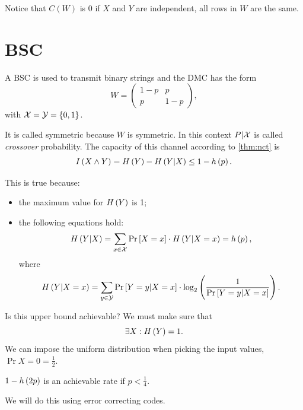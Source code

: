 Notice that $C(W)$ is 0 if $X$ and $Y$ are independent, \ie all rows in $W$ are the same. 

\section{\acl{BSC}}

A \ac{BSC} is used to transmit binary strings and the \ac{DMC} has the form
\begin{equation*}
	W = 
	\begin{pmatrix}
		1-p & p \\
		p & 1-p
	\end{pmatrix},
\end{equation*}
with $\mathcal{X} = \mathcal{Y} = \{0,1\}$.

It is called symmetric because $W$ is symmetric.
In this context $P|\mathcal{X}$ is called \emph{crossover} probability.
The capacity of this channel according to \cref{thm:nct} is
\begin{equation*}
	I \left( {X \wedge Y} \right)
	=
	H\left({Y}\right) - H\left({Y|X}\right)
	\le
	1 - h\left({p}\right).
\end{equation*}

This is true because:
\begin{itemize}
	\item the maximum value for $H\left({Y}\right)$ is 1;
	\item the following equations hold:
		\begin{equation*}
			H\left({Y | X}\right) =
			\sum_{x \in \mathcal{X}} \mathop{\mathrm{Pr}}\limits_{} \left[ {X = x} \right] \cdot H\left({Y | X = x}\right) =
			h\left({p}\right),
		\end{equation*}
		where
		\begin{equation*}
			H\left({Y | X = x}\right) =
			\sum_{y \in \mathcal{Y}} \mathop{\mathrm{Pr}}\limits_{} \left[ {Y = y | X = x} \right] \cdot
			\log_2 \left( {\frac{1}{\mathop{\mathrm{Pr}}\limits_{} \left[ {Y = y | X = x} \right]}} \right).
		\end{equation*}
\end{itemize} 

Is this upper bound achievable? We must make sure that
\begin{equation*}
	\exists X : H\left({Y}\right) = 1.
\end{equation*}
We can impose the uniform distribution when picking the input values, \ie $\Pr{X = 0} = \frac{1}{2}$.

\begin{obs}
	$1-h\left({2p}\right)$ is an achievable rate if $p < \frac{1}{4}$.
\end{obs}
We will do this using error correcting codes.

